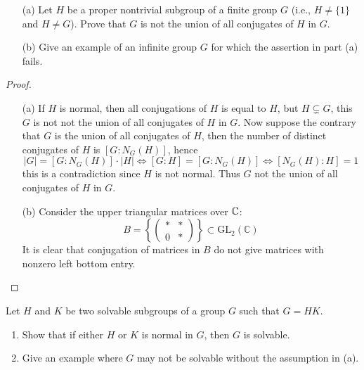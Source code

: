 \begin{prob}[S2011-Q1, F2004-Q1]
    \phantom{text}
    \begin{itemize}
    \item[(a)] Let \( H \) be a proper nontrivial subgroup of a finite group \( G \) (i.e., \( H \neq \{1\} \) and \( H \neq G \)).  
    Prove that \( G \) is not the union of all conjugates of \( H \) in \( G \).
    
    \item[(b)] Give an example of an infinite group \( G \) for which the assertion in part (a) fails.
    \end{itemize}
\end{prob}
\begin{proof}
    \begin{itemize}
        \item[(a)] If $H$ is normal, then all conjugations of $H$ is equal to $H$, but $H\subsetneq G$, this $G$ is not not the union of all conjugates of \( H \) in \( G \). Now suppose the contrary that $G$ is the union of all conjugates of $H$, then the number of distinct conjugates of $H$ is $[G:N_G(H)]$, hence 
        \begin{equation*}
            |G|=[G:N_G(H)]\cdot|H|\iff [G:H]=[G:N_G(H)]\iff [N_G(H):H]=1
        \end{equation*}
        this is a contradiction since $H$ is not normal. Thus $G$ not the union of all conjugates of \( H \) in \( G \).
        \item[(b)] Consider the upper triangular matrices over $\mathbb{C}$:
        \begin{equation*}
            B=\left\{\begin{pmatrix}
                *&*\\
                0&*
            \end{pmatrix}\right\}\subset \text{GL}_2(\mathbb{C})
        \end{equation*}
        It is clear that conjugation of matrices in $B$ do not give matrices with nonzero left bottom entry.
    \end{itemize}
\end{proof}

\begin{prob}[S2009-Q1]
    Let \( H \) and \( K \) be two solvable subgroups of a group \( G \) such that \( G = HK \).
    
    \begin{enumerate}
        \item Show that if either \( H \) or \( K \) is normal in \( G \), then \( G \) is solvable.
        
        \item Give an example where \( G \) may not be solvable without the assumption in (a).
    \end{enumerate}
\end{prob}

